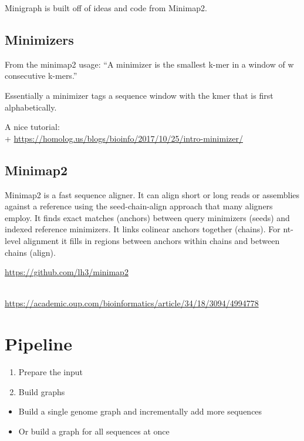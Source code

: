 \documentclass[
]{book}
\providecommand{\tightlist}{%
  \setlength{\itemsep}{0pt}\setlength{\parskip}{0pt}}
\begin{document}
Minigraph is built off of ideas and code from Minimap2.

\hypertarget{minimizers}{%
\subsection*{Minimizers}\label{minimizers}}

From the minimap2 usage:
``A minimizer is the smallest k-mer in a window of w consecutive k-mers.''

Essentially a minimizer tags a sequence window with the kmer that is first alphabetically.

A nice tutorial:\\
+ \url{https://homolog.us/blogs/bioinfo/2017/10/25/intro-minimizer/}

\hypertarget{minimap2}{%
\subsection*{Minimap2}\label{minimap2}}

Minimap2 is a fast sequence aligner.
It can align short or long reads or assemblies against a reference using the seed-chain-align approach that many aligners employ. It finds exact matches (anchors) between query minimizers (seeds) and indexed reference minimizers. It links colinear anchors together (chains). For nt-level alignment it fills in regions between anchors within chains and between chains (align).

\url{https://github.com/lh3/minimap2}\strut \\
\url{https://academic.oup.com/bioinformatics/article/34/18/3094/4994778}

\hypertarget{pipeline}{%
\section{Pipeline}\label{pipeline}}

\begin{enumerate}
\def\labelenumi{\arabic{enumi}.}
\tightlist
\item
  Prepare the input
\item
  Build graphs
\end{enumerate}

\begin{itemize}
\tightlist
\item
  Build a single genome graph and incrementally add more sequences
\item
  Or build a graph for all sequences at once
\end{itemize}
\end{document}

